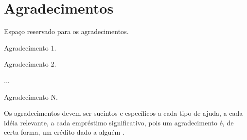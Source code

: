 
\chapter*{Agradecimentos}

\thispagestyle{myheadings}

\noindent

Espaço reservado para os agradecimentos.

Agradecimento 1.

Agradecimento 2.

...

Agradecimento N.

Os agradecimentos devem ser sucintos e específicos
a cada tipo de ajuda, a cada idéia relevante, 
a cada empréstimo significativo, pois um agradecimento
é, de certa forma, um crédito dado a alguém \cite{norma:esjo2005}.

